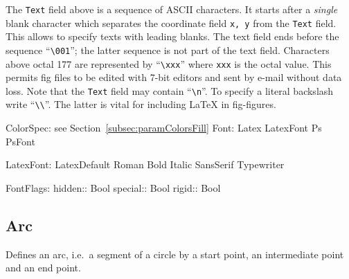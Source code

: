 \documentclass[10pt, a4paper, english]{article}%
\begin{document}
The \texttt{Text} field above is a sequence of ASCII characters. 
It starts after a \emph{single} blank character 
which separates the coordinate field \texttt{x, y} 
from the \texttt{Text} field. 
This allows to specify texts with leading blanks. 
The text field ends before the sequence ``\texttt{\textbackslash{}001}''; 
the latter sequence is not part of the text field. 
Characters above octal 177 are represented by ``\texttt{\textbackslash{}xxx}'' 
where \texttt{xxx} is the octal value. 
This permits fig files to be edited with 7-bit editors 
and sent by e-mail without data loss. 
Note that the \texttt{Text} field may contain ``\texttt{\textbackslash{}n}''. 
To specify a literal backslash write ``\texttt{\textbackslash\textbackslash}''. 
The latter is vital for including \LaTeX{} in fig-figures. 




ColorSpec: see Section~\ref{subsec:paramColorsFill}
Font:
Latex LatexFont	 
Ps PsFont	 


LatexFont:
LatexDefault	 
Roman	 
Bold	 
Italic	 
SansSerif	 
Typewriter	 


FontFlags:
hidden:: Bool
special:: Bool
rigid:: Bool





\subsection{Arc}\label{subsec:arc}

Defines an arc, i.e.~a segment of a circle by a start point, 
an intermediate point and an end point. 
\end{document}
